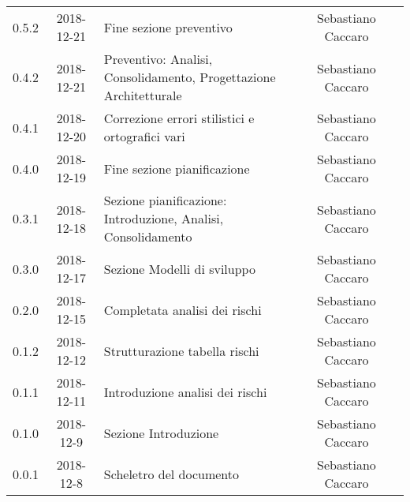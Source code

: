 {\begin{longtable}{ c c  C{4cm}  c  c }
		0.5.2 & 2018-12-21 & Fine sezione preventivo & Sebastiano Caccaro & \reda{}\\
		
		0.4.2 & 2018-12-21 & Preventivo: Analisi, Consolidamento, Progettazione Architetturale & Sebastiano Caccaro & \reda{}\\
		
		0.4.1 & 2018-12-20 & Correzione errori stilistici e ortografici vari & Sebastiano Caccaro & \reda{}\\
		
		0.4.0 & 2018-12-19 & Fine sezione pianificazione & Sebastiano Caccaro & \reda{}\\
		
		0.3.1 & 2018-12-18 & Sezione pianificazione: Introduzione, Analisi, Consolidamento & Sebastiano Caccaro & \reda{}\\
		
		0.3.0 & 2018-12-17 & Sezione Modelli di sviluppo & Sebastiano Caccaro & \reda{}\\
				
		0.2.0 & 2018-12-15 & Completata analisi dei rischi & Sebastiano Caccaro & \reda{}\\
				
		0.1.2 & 2018-12-12 & Strutturazione tabella rischi & Sebastiano Caccaro & \reda{}\\
				
		0.1.1 & 2018-12-11 & Introduzione analisi dei rischi & Sebastiano Caccaro & \reda{}\\
				
		0.1.0 & 2018-12-9 & Sezione Introduzione & Sebastiano Caccaro & \reda{}\\
		
		0.0.1 & 2018-12-8 & Scheletro del documento & Sebastiano Caccaro & \reda{}\\
		
	\end{longtable}

}